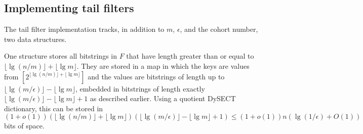 \documentclass[11pt,letterpaper]{article}
\begin{document}
\subsection{Implementing tail filters}

The tail filter implementation tracks, in addition to $m$, $\epsilon$, and the cohort number, two data structures.


One structure stores all bitstrings in $F$ that have length greater than or equal to $\lfloor \lg (n/m) \rfloor + \lfloor \lg m \rfloor$.
They are stored in a map in which the keys are values from $[2^{\lfloor \lg (n/m) \rfloor + \lfloor \lg m \rfloor}]$ and the values are bitstrings of length up to $\lfloor \lg (m/\epsilon) \rfloor - \lfloor \lg m \rfloor$, embedded in bitstrings of length exactly $\lfloor \lg (m/\epsilon) \rfloor - \lfloor \lg m \rfloor + 1$ as described earlier.
Using a quotient DySECT dictionary, this can be stored in $(1 + o(1))(\lfloor \lg (n/m) \rfloor + \lfloor \lg m \rfloor)(\lfloor \lg (m/\epsilon) \rfloor - \lfloor \lg m \rfloor + 1) \leq (1+o(1))n(\lg (1/\epsilon) + O(1))$ bits of space.






\end{document}
